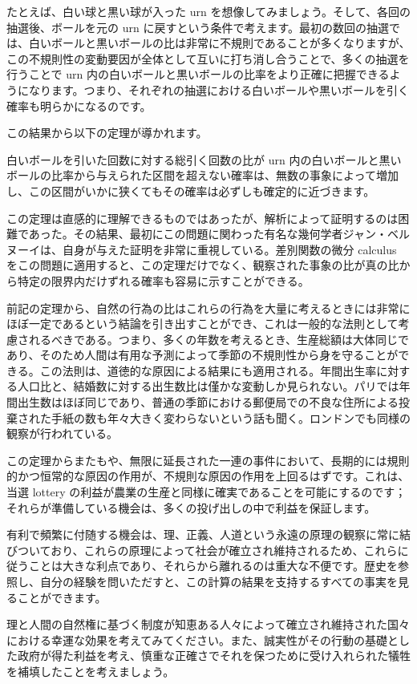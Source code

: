 \documentclass[a4paper,11pt,openany]{ltjsbook}
\begin{document}
たとえば、白い球と黒い球が入った urn を想像してみましょう。そして、各回の抽選後、ボールを元の urn に戻すという条件で考えます。最初の数回の抽選では、白いボールと黒いボールの比は非常に不規則であることが多くなりますが、この不規則性の変動要因が全体として互いに打ち消し合うことで、多くの抽選を行うことで urn 内の白いボールと黒いボールの比率をより正確に把握できるようになります。つまり、それぞれの抽選における白いボールや黒いボールを引く確率も明らかになるのです。

この結果から以下の定理が導かれます。

白いボールを引いた回数に対する総引く回数の比が urn 内の白いボールと黒いボールの比率から与えられた区間を超えない確率は、無数の事象によって増加し、この区間がいかに狭くてもその確率は必ずしも確定的に近づきます。

この定理は直感的に理解できるものではあったが、解析によって証明するのは困難であった。その結果、最初にこの問題に関わった有名な幾何学者ジャン・ベルヌーイは、自身が与えた証明を非常に重視している。差別関数の微分 calculus をこの問題に適用すると、この定理だけでなく、観察された事象の比が真の比から特定の限界内だけずれる確率も容易に示すことができる。

前記の定理から、自然の行為の比はこれらの行為を大量に考えるときには非常にほぼ一定であるという結論を引き出すことができ、これは一般的な法則として考慮されるべきである。つまり、多くの年数を考えるとき、生産総額は大体同じであり、そのため人間は有用な予測によって季節の不規則性から身を守ることができる。この法則は、道徳的な原因による結果にも適用される。年間出生率に対する人口比と、結婚数に対する出生数比は僅かな変動しか見られない。パリでは年間出生数はほぼ同じであり、普通の季節における郵便局での不良な住所による投棄された手紙の数も年々大きく変わらないという話も聞く。ロンドンでも同様の観察が行われている。

この定理からまたもや、無限に延長された一連の事件において、長期的には規則的かつ恒常的な原因の作用が、不規則な原因の作用を上回るはずです。これは、当選 lottery の利益が農業の生産と同様に確実であることを可能にするのです；それらが準備している機会は、多くの投げ出しの中で利益を保証します。

有利で頻繁に付随する機会は、理、正義、人道という永遠の原理の観察に常に結びついており、これらの原理によって社会が確立され維持されるため、これらに従うことは大きな利点であり、それらから離れるのは重大な不便です。歴史を参照し、自分の経験を問いただすと、この計算の結果を支持するすべての事実を見ることができます。

理と人間の自然権に基づく制度が知恵ある人々によって確立され維持された国々における幸運な効果を考えてみてください。また、誠実性がその行動の基礎とした政府が得た利益を考え、慎重な正確さでそれを保つために受け入れられた犠牲を補填したことを考えましょう。
\end{document}
